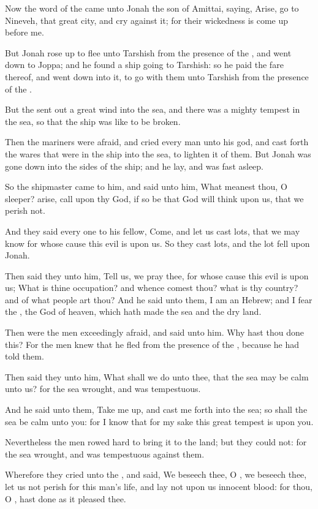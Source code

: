 \Chapter
\Verse Now the word of the \LORD came unto Jonah the son of Amittai, saying, \Verse Arise, go to Nineveh, that great city, and cry against it; for their wickedness is come up before me.

\Verse But Jonah rose up to flee unto Tarshish from the presence of the \LORD, and went down to Joppa; and he found a ship going to Tarshish: so he paid the fare thereof, and went down into it, to go with them unto Tarshish from the presence of the \LORD.

\Verse But the \LORD sent out a great wind into the sea, and there was a mighty tempest in the sea, so that the ship was like to be broken.

\Verse Then the mariners were afraid, and cried every man unto his god, and cast forth the wares that were in the ship into the sea, to lighten it of them. But Jonah was gone down into the sides of the ship; and he lay, and was fast asleep.

\Verse So the shipmaster came to him, and said unto him, What meanest thou, O sleeper? arise, call upon thy God, if so be that God will think upon us, that we perish not.

\Verse And they said every one to his fellow, Come, and let us cast lots, that we may know for whose cause this evil is upon us. So they cast lots, and the lot fell upon Jonah.

\Verse Then said they unto him, Tell us, we pray thee, for whose cause this evil is upon us; What is thine occupation? and whence comest thou? what is thy country? and of what people art thou?  \Verse And he said unto them, I am an Hebrew; and I fear the \LORD, the God of heaven, which hath made the sea and the dry land.

\Verse Then were the men exceedingly afraid, and said unto him. Why hast thou done this? For the men knew that he fled from the presence of the \LORD, because he had told them.

\Verse Then said they unto him, What shall we do unto thee, that the sea may be calm unto us? for the sea wrought, and was tempestuous.

\Verse And he said unto them, Take me up, and cast me forth into the sea; so shall the sea be calm unto you: for I know that for my sake this great tempest is upon you.

\Verse Nevertheless the men rowed hard to bring it to the land; but they could not: for the sea wrought, and was tempestuous against them.

\Verse Wherefore they cried unto the \LORD, and said, We beseech thee, O \LORD, we beseech thee, let us not perish for this man's life, and lay not upon us innocent blood: for thou, O \LORD, hast done as it pleased thee.

